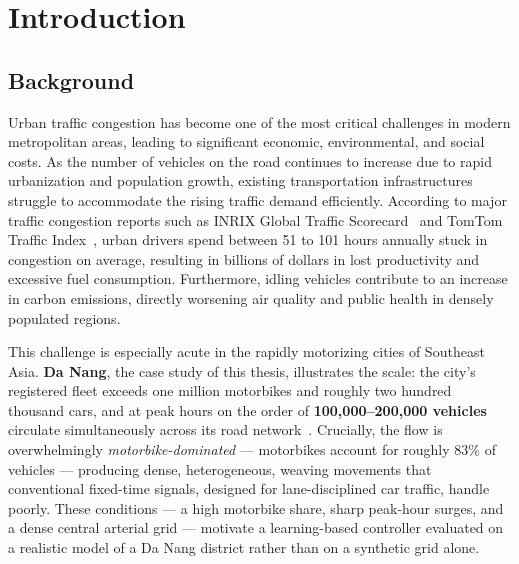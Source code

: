 \documentclass[12pt]{report} %
\newcommand{\supervisorone}{Dr. Le Van Minh}
\begin{document}

\tableofcontents

\listoftables

\listoffigures

\cleardoublepage
{}

\chapter{Introduction}


\section{Background}
Urban traffic congestion has become one of the most critical challenges in modern metropolitan areas, leading to significant economic, environmental, and social costs. As the number of vehicles on the road continues to increase due to rapid urbanization and population growth, existing transportation infrastructures struggle to accommodate the rising traffic demand efficiently. According to major traffic congestion reports such as INRIX Global Traffic Scorecard~\cite{inrix2023} and TomTom Traffic Index~\cite{tomtom2023}, urban drivers spend between 51 to 101 hours annually stuck in congestion on average, resulting in billions of dollars in lost productivity and excessive fuel consumption. Furthermore, idling vehicles contribute to an increase in carbon emissions, directly worsening air quality and public health in densely populated regions.

This challenge is especially acute in the rapidly motorizing cities of Southeast Asia. \textbf{Da Nang}, the case study of this thesis, illustrates the scale: the city's registered fleet exceeds one million motorbikes and roughly two hundred thousand cars, and at peak hours on the order of \textbf{100{,}000--200{,}000 vehicles} circulate simultaneously across its road network~\cite{DaNangTraffic_MOT2024}. Crucially, the flow is overwhelmingly \textit{motorbike-dominated} --- motorbikes account for roughly $83\%$ of vehicles --- producing dense, heterogeneous, weaving movements that conventional fixed-time signals, designed for lane-disciplined car traffic, handle poorly. These conditions --- a high motorbike share, sharp peak-hour surges, and a dense central arterial grid --- motivate a learning-based controller evaluated on a realistic model of a Da Nang district rather than on a synthetic grid alone.
\end{document}

